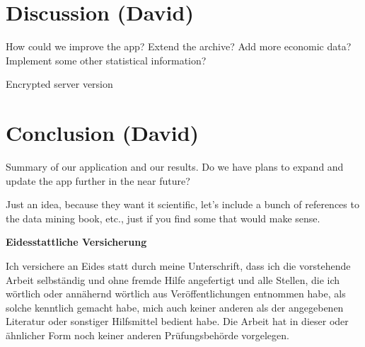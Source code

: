 \documentclass[12pt,a4paper]{article}
\begin{document}
\hypertarget{discussion-david}{%
\section{Discussion (David)}\label{discussion-david}}

How could we improve the app? Extend the archive? Add more economic
data? Implement some other statistical information?

Encrypted server version

\hypertarget{conclusion-david}{%
\section{Conclusion (David)}\label{conclusion-david}}

Summary of our application and our results. Do we have plans to expand
and update the app further in the near future?

Just an idea, because they want it scientific, let's include a bunch of
references to the data mining book, etc., just if you find some that
would make sense.

\newpage
\renewcommand*{\mkbibnamefamily}[1]{\textbf{#1}}
\renewcommand*{\mkbibnamegiven}[1]{\textbf{#1}}
\renewcommand*{\mkbibnameprefix}[1]{\textbf{#1}}
\renewcommand*{\mkbibnamesuffix}[1]{\textbf{#1}}
\printbibliography[title=References]

\newpage
\textbf{Eidesstattliche Versicherung}

\bigskip

Ich versichere an Eides statt durch meine Unterschrift, dass ich die vorstehende Arbeit selbständig und ohne fremde Hilfe angefertigt und alle Stellen, die ich wörtlich oder annähernd wörtlich aus Veröffentlichungen entnommen habe, als solche kenntlich gemacht habe, mich auch keiner anderen als der angegebenen Literatur oder sonstiger Hilfsmittel bedient habe. Die Arbeit hat in dieser oder ähnlicher Form noch keiner anderen Prüfungsbehörde vorgelegen.

\vspace{1cm}
\rule{0pt}{2\baselineskip} %
\par\noindent{} \hfill\makebox[2.25in]{\hrulefill}%
\par\noindent\makebox[2.25in][l]{} \hfill{}%
\end{document}
